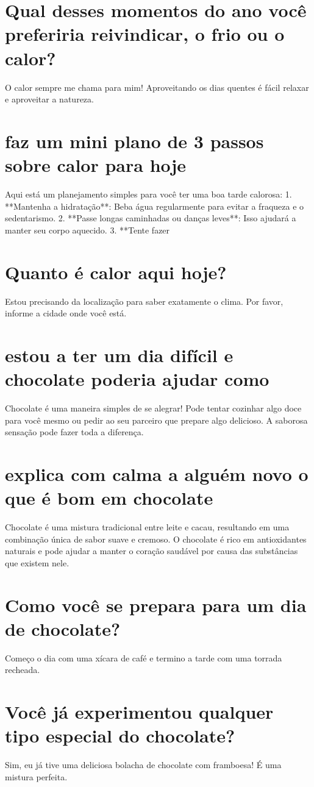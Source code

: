 \documentclass[11pt,a4paper]{article}
\begin{document}
\section{Qual desses momentos do ano você preferiria reivindicar, o frio ou o calor?}
O calor sempre me chama para mim! Aproveitando os dias quentes é fácil relaxar e aproveitar a natureza.

\section{faz um mini plano de 3 passos sobre calor para hoje}
Aqui está um planejamento simples para você ter uma boa tarde calorosa: 1. **Mantenha a hidratação**: Beba água regularmente para evitar a fraqueza e o sedentarismo. 2. **Passe longas caminhadas ou danças leves**: Isso ajudará a manter seu corpo aquecido. 3. **Tente fazer

\section{Quanto é calor aqui hoje?}
Estou precisando da localização para saber exatamente o clima. Por favor, informe a cidade onde você está.

\section{estou a ter um dia difícil e chocolate poderia ajudar como}
Chocolate é uma maneira simples de se alegrar! Pode tentar cozinhar algo doce para você mesmo ou pedir ao seu parceiro que prepare algo delicioso. A saborosa sensação pode fazer toda a diferença.

\section{explica com calma a alguém novo o que é bom em chocolate}
Chocolate é uma mistura tradicional entre leite e cacau, resultando em uma combinação única de sabor suave e cremoso. O chocolate é rico em antioxidantes naturais e pode ajudar a manter o coração saudável por causa das substâncias que existem nele.

\section{Como você se prepara para um dia de chocolate?}
Começo o dia com uma xícara de café e termino a tarde com uma torrada recheada.

\section{Você já experimentou qualquer tipo especial do chocolate?}
Sim, eu já tive uma deliciosa bolacha de chocolate com framboesa! É uma mistura perfeita.
\end{document}
